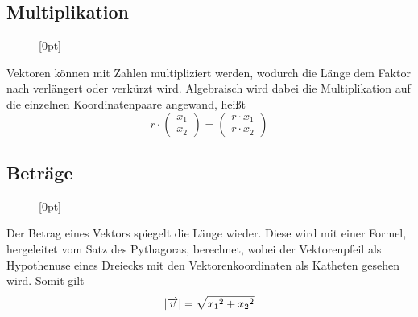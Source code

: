 \documentclass{article}
\begin{document}
\subsection{Multiplikation}
\begin{wrapfigure}{r}{5cm}
  \centering
  \raisebox{-2cm}[0pt]{
  } 
\end{wrapfigure}
Vektoren können mit Zahlen multipliziert werden, wodurch die Länge dem Faktor nach verlängert oder verkürzt wird. Algebraisch wird dabei die Multiplikation auf die einzelnen Koordinatenpaare angewand, heißt
\[ 
 r \cdot
 \begin{pmatrix} x_1 \\ x_2 \end{pmatrix} =
 \begin{pmatrix} r \cdot x_1 \\ r \cdot x_2 \end{pmatrix} 
\]
 
\subsection{Beträge}
\begin{wrapfigure}{l}{5cm}
  \centering
  \raisebox{-1.7cm}[0pt]{
  }
\end{wrapfigure}
Der Betrag eines Vektors spiegelt die Länge wieder. Diese wird mit einer Formel, hergeleitet vom Satz des Pythagoras, berechnet, wobei der Vektorenpfeil als Hypothenuse eines Dreiecks mit den Vektorenkoordinaten als Katheten gesehen wird. Somit gilt
\[
 \left| {\overrightarrow{v}} \right| =
 \sqrt{{x_1}^2 + {x_2}^2}
\]
 
\end{document}
